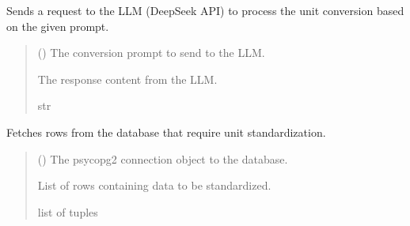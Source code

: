 \documentclass[letterpaper,10pt,english]{sphinxmanual}
\begin{document}

\begin{fulllineitems}
\label{\detokenize{modules.data_storage:modules.data_storage.llm_standardize.call_llm}}
\pysigstartsignatures
\pysiglinewithargsret
{}
{}
{}
\pysigstopsignatures
\sphinxAtStartPar
Sends a request to the LLM (DeepSeek API) to process the unit conversion based on the given prompt.
\begin{quote}\begin{description}
\sphinxAtStartPar
{} () \textendash{} The conversion prompt to send to the LLM.

\sphinxAtStartPar
The response content from the LLM.

\sphinxAtStartPar
str

\end{description}\end{quote}

\end{fulllineitems}


\begin{fulllineitems}
\label{\detokenize{modules.data_storage:modules.data_storage.llm_standardize.fetch_rows_to_standardize}}
\pysigstartsignatures
\pysiglinewithargsret
{}
{}
{}
\pysigstopsignatures
\sphinxAtStartPar
Fetches rows from the database that require unit standardization.
\begin{quote}\begin{description}
\sphinxAtStartPar
{} () \textendash{} The psycopg2 connection object to the database.

\sphinxAtStartPar
List of rows containing data to be standardized.

\sphinxAtStartPar
list of tuples

\end{description}\end{quote}

\end{fulllineitems}
\end{document}
